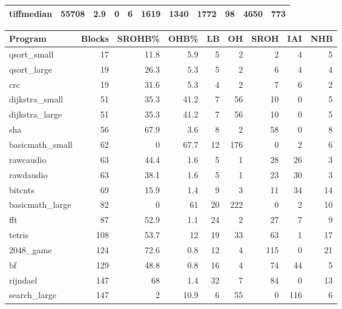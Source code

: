 \begin{tabular}{lrrrrrrrrrr}
 tiffmedian      &          55708 &      2.9 &    0   &    6 &   1619 &       1340 &         1772 &    98 &  4650 &   773 \\
\hline
\end{tabular}\begin{tabular}{lrrrrrrrr}
\hline
 Program         &   Blocks &   SROHB\% &   OHB\% &   LB &   OH &   SROH &   IAI &   NHB \\
\hline
 qsort\_small     &       17 &     11.8 &    5.9 &    5 &    2 &      2 &     4 &     5 \\
 qsort\_large     &       19 &     26.3 &    5.3 &    5 &    2 &      6 &     4 &     4 \\
 crc             &       19 &     31.6 &    5.3 &    4 &    2 &      7 &     6 &     2 \\
 dijkstra\_small  &       51 &     35.3 &   41.2 &    7 &   56 &     10 &     0 &     5 \\
 dijkstra\_large  &       51 &     35.3 &   41.2 &    7 &   56 &     10 &     0 &     5 \\
 sha             &       56 &     67.9 &    3.6 &    8 &    2 &     58 &     0 &     8 \\
 basicmath\_small &       62 &      0   &   67.7 &   12 &  176 &      0 &     2 &     6 \\
 rawcaudio       &       63 &     44.4 &    1.6 &    5 &    1 &     28 &    26 &     3 \\
 rawdaudio       &       63 &     38.1 &    1.6 &    5 &    1 &     23 &    30 &     3 \\
 bitcnts         &       69 &     15.9 &    1.4 &    9 &    3 &     11 &    34 &    14 \\
 basicmath\_large &       82 &      0   &   61   &   20 &  222 &      0 &     2 &    10 \\
 fft             &       87 &     52.9 &    1.1 &   24 &    2 &     27 &     7 &     9 \\
 tetris          &      108 &     53.7 &   12   &   19 &   33 &     63 &     1 &    17 \\
 2048\_game       &      124 &     72.6 &    0.8 &   12 &    4 &    115 &     0 &    21 \\
 bf              &      129 &     48.8 &    0.8 &   16 &    4 &     74 &    44 &     5 \\
 rijndael        &      147 &     68   &    1.4 &   32 &    7 &     84 &     0 &    13 \\
 search\_large    &      147 &      2   &   10.9 &    6 &   55 &      0 &   116 &     6 \\

\end{tabular}
